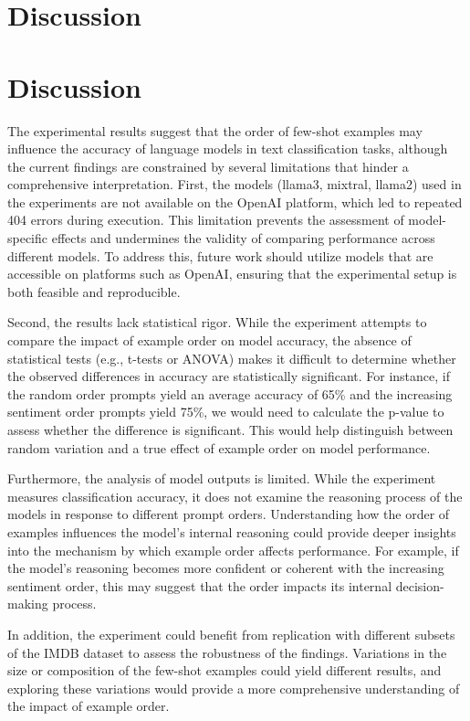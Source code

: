 \documentclass{article}
\begin{document}
\section{Discussion}
\section{Discussion}

The experimental results suggest that the order of few-shot examples may influence the accuracy of language models in text classification tasks, although the current findings are constrained by several limitations that hinder a comprehensive interpretation. First, the models (llama3, mixtral, llama2) used in the experiments are not available on the OpenAI platform, which led to repeated 404 errors during execution. This limitation prevents the assessment of model-specific effects and undermines the validity of comparing performance across different models. To address this, future work should utilize models that are accessible on platforms such as OpenAI, ensuring that the experimental setup is both feasible and reproducible.

Second, the results lack statistical rigor. While the experiment attempts to compare the impact of example order on model accuracy, the absence of statistical tests (e.g., t-tests or ANOVA) makes it difficult to determine whether the observed differences in accuracy are statistically significant. For instance, if the random order prompts yield an average accuracy of 65\% and the increasing sentiment order prompts yield 75\%, we would need to calculate the p-value to assess whether the difference is significant. This would help distinguish between random variation and a true effect of example order on model performance.

Furthermore, the analysis of model outputs is limited. While the experiment measures classification accuracy, it does not examine the reasoning process of the models in response to different prompt orders. Understanding how the order of examples influences the model's internal reasoning could provide deeper insights into the mechanism by which example order affects performance. For example, if the model's reasoning becomes more confident or coherent with the increasing sentiment order, this may suggest that the order impacts its internal decision-making process.

In addition, the experiment could benefit from replication with different subsets of the IMDB dataset to assess the robustness of the findings. Variations in the size or composition of the few-shot examples could yield different results, and exploring these variations would provide a more comprehensive understanding of the impact of example order.
\end{document}
